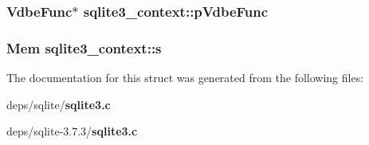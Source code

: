 \subsubsection{\setlength{\rightskip}{0pt plus 5cm}\bf{Vdbe\-Func}$\ast$ \bf{sqlite3\_\-context::p\-Vdbe\-Func}}\label{structsqlite3__context_fedf80a76633463d0de1653603fc6d36}


\subsubsection{\setlength{\rightskip}{0pt plus 5cm}\bf{Mem} \bf{sqlite3\_\-context::s}}\label{structsqlite3__context_689b36eeb9f9efe5c65d44b32f28014f}




The documentation for this struct was generated from the following files:\begin{CompactItemize}
\item 
deps/sqlite/\bf{sqlite3.c}\item 
deps/sqlite-3.7.3/\bf{sqlite3.c}\end{CompactItemize}
